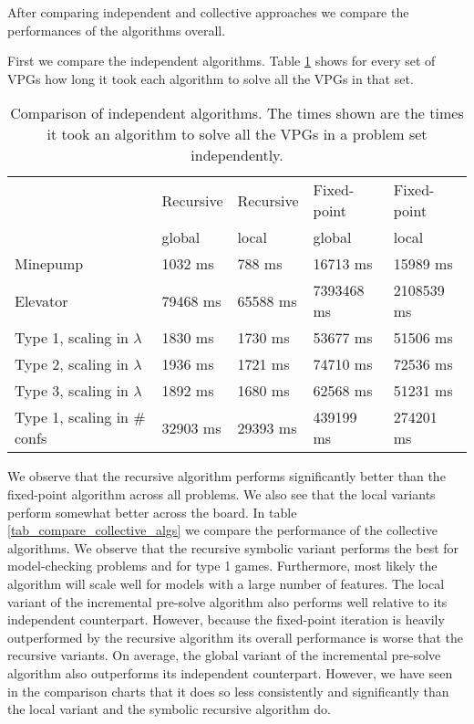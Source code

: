 After comparing independent and collective approaches we compare the performances of the algorithms overall.

First we compare the independent algorithms. Table \ref{tab_compare_independent_algs} shows for every set of VPGs how long it took each algorithm to solve all the VPGs in that set.
\begin{table}[h]
	\centering
	\begin{tabular}{|l|l|l|l|l|}
		\hline
		& Recursive &Recursive & Fixed-point & Fixed-point\\
		& global & local & global & local \\
		\hline
		Minepump& 1032 ms& 788 ms& 16713 ms& 15989 ms\\ \hline
		Elevator& 79468 ms& 65588 ms& 7393468 ms& 2108539 ms\\ \hline
		Type 1, scaling in $\lambda$& 1830 ms& 1730 ms& 53677 ms& 51506 ms\\ \hline
		Type 2, scaling in $\lambda$& 1936 ms& 1721 ms& 74710 ms& 72536 ms\\ \hline
		Type 3, scaling in $\lambda$& 1892 ms& 1680 ms& 62568 ms& 51231 ms\\ \hline
		Type 1, scaling in \# confs& 32903 ms& 29393 ms& 439199 ms& 274201 ms\\ \hline
	\end{tabular}
	\caption{Comparison of independent algorithms. The times shown are the times it took an algorithm to solve all the VPGs in a problem set independently.}
	\label{tab_compare_independent_algs}
\end{table}
We observe that the recursive algorithm performs significantly better than the fixed-point algorithm across all problems. We also see that the local variants perform somewhat better across the board.
In table \ref{tab_compare_collective_algs} we compare the performance of the collective algorithms.
We observe that the recursive symbolic variant performs the best for model-checking problems and for type 1 games. Furthermore, most likely the algorithm will scale well for models with a large number of features. The local variant of the incremental pre-solve algorithm also performs well relative to its independent counterpart. However, because the fixed-point iteration is heavily outperformed by the recursive algorithm its overall performance is worse that the recursive variants. On average, the global variant of the incremental pre-solve algorithm also outperforms its independent counterpart. However, we have seen in the comparison charts that it does so less consistently and significantly than the local variant and the symbolic recursive algorithm do.
